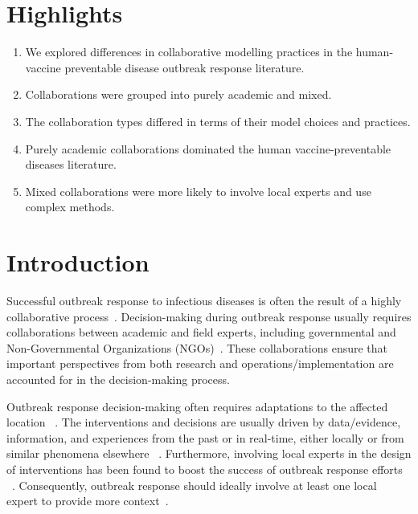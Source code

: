 \documentclass[10pt,letterpaper]{article}
\begin{document}
\section*{Highlights}
\begin{enumerate}
	\item We explored differences in collaborative modelling practices in the human-vaccine preventable disease outbreak response literature.
	\item Collaborations were grouped into purely academic and mixed.
	\item The collaboration types differed in terms of their model choices and practices.
	\item Purely academic collaborations dominated the human vaccine-preventable diseases literature.
	\item Mixed collaborations were more likely to involve local experts and use complex methods.
\end{enumerate}

\linenumbers

\section*{Introduction}
Successful outbreak response to infectious diseases is often the result of a highly collaborative process~\cite{Sigfrid2020}. Decision-making during outbreak response usually requires collaborations between academic and field experts, including governmental and Non-Governmental Organizations (NGOs)~\cite{Kretzschmar2020,Kerkhove2012,Okiror2021,Whitty2014,Sigfrid2020}. These collaborations ensure that important perspectives from both research and operations/implementation are accounted for in the decision-making process. 

Outbreak response decision-making often requires adaptations to the affected location ~\cite{Whitty2014,Heesterbeek2015,Sigfrid2020}. The interventions and decisions are usually driven by data/evidence, information, and experiences from the past or in real-time, either locally or from similar phenomena elsewhere ~\cite{Abramowitz2015,Kerkhove2012}. Furthermore, involving local experts in the design of interventions has been found to boost the success of outbreak response efforts ~\cite{Sigfrid2020}. Consequently, outbreak response should ideally involve at least one local expert to provide more context~\cite{Sigfrid2020}.  
\end{document}
